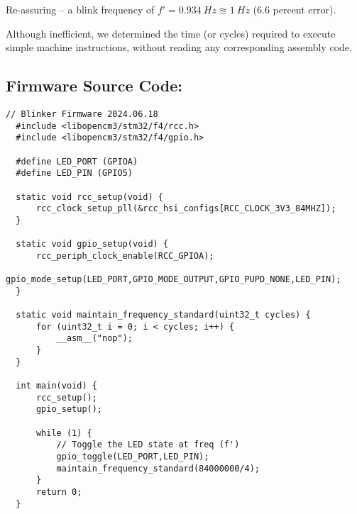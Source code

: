 \documentclass[a4paper,12pt]{article}   	%
\begin{document}
\begin{flushleft}
Re-assuring -- a blink frequency of $f' = 0.934\ Hz \approxeq 1\ Hz$ (6.6 percent error). 


Although inefficient, we determined the time (or cycles) required 
to execute simple machine instructions, without reading any corresponding assembly code.\\[90 ex]



\end{flushleft}

\subsection*{Firmware Source Code:}
\begin{lstlisting}[backgroundcolor = \color{beige}]
  // Blinker Firmware 2024.06.18
  #include <libopencm3/stm32/f4/rcc.h>
  #include <libopencm3/stm32/f4/gpio.h>
  
  #define LED_PORT (GPIOA)
  #define LED_PIN (GPIO5)
  
  static void rcc_setup(void) {
      rcc_clock_setup_pll(&rcc_hsi_configs[RCC_CLOCK_3V3_84MHZ]);
  }

  static void gpio_setup(void) {
      rcc_periph_clock_enable(RCC_GPIOA);
      gpio_mode_setup(LED_PORT,GPIO_MODE_OUTPUT,GPIO_PUPD_NONE,LED_PIN);
  }
  
  static void maintain_frequency_standard(uint32_t cycles) {
      for (uint32_t i = 0; i < cycles; i++) {
          __asm__("nop");
      }
  }
  
  int main(void) {
      rcc_setup();
      gpio_setup();
  
      while (1) {
          // Toggle the LED state at freq (f')
          gpio_toggle(LED_PORT,LED_PIN);
          maintain_frequency_standard(84000000/4);
      }
      return 0;
  }


\end{lstlisting}
\end{document}
